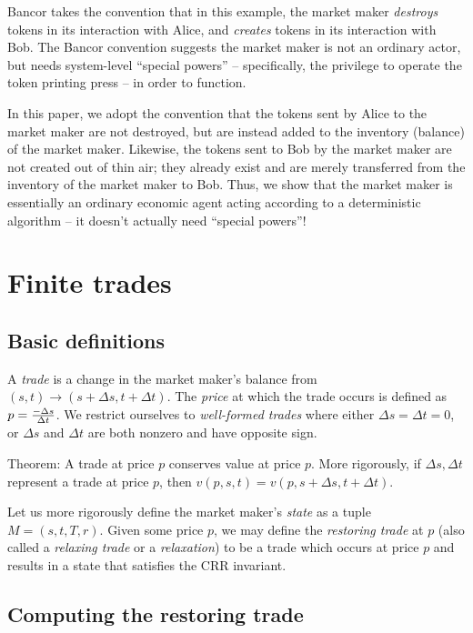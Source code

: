 \documentclass{article}
\begin{document}
Bancor takes the convention that in this example, the market maker \textit{destroys}
tokens in its interaction with Alice, and \textit{creates} tokens in its interaction
with Bob.  The Bancor convention suggests the market maker is not
an ordinary actor, but needs system-level ``special powers'' -- specifically,
the privilege to operate the token printing press -- in order to function.

In this paper, we adopt the convention that the tokens sent by Alice to the
market maker are not destroyed, but are instead added to the inventory (balance)
of the market maker.  Likewise, the tokens sent to Bob by the market maker
are not created out of thin air; they already exist and are merely
transferred from the inventory of the market maker to Bob.  Thus, we show
that the market maker is essentially an ordinary economic agent acting according
to a deterministic algorithm -- it doesn't actually need ``special powers''!

\section{Finite trades}

\subsection{Basic definitions}

A \textit{trade} is a change in the market maker's balance from
$(s, t) \to (s+\Delta s, t+\Delta t)$.  The \textit{price} at which the
trade occurs is defined as $p = {- \Delta s \over \Delta t}$.  We restrict
ourselves to \textit{well-formed trades} where either $\Delta s = \Delta t = 0$,
or $\Delta s$ and $\Delta t$ are both nonzero and have opposite sign.

Theorem:  A trade at price $p$ conserves value at price $p$.  More rigorously,
if $\Delta s, \Delta t$ represent a trade at price $p$, then
$v(p, s, t) = v(p, s + \Delta s, t + \Delta t)$.

Let us more rigorously define the market maker's \textit{state} as a tuple
$M = (s, t, T, r)$.  Given some price $p$, we may define the
\textit{restoring trade} at $p$ (also called a \textit{relaxing trade} or
a \textit{relaxation}) to be a trade which occurs at price $p$ and results in a
state that satisfies the CRR invariant.

\subsection{Computing the restoring trade}
\end{document}

